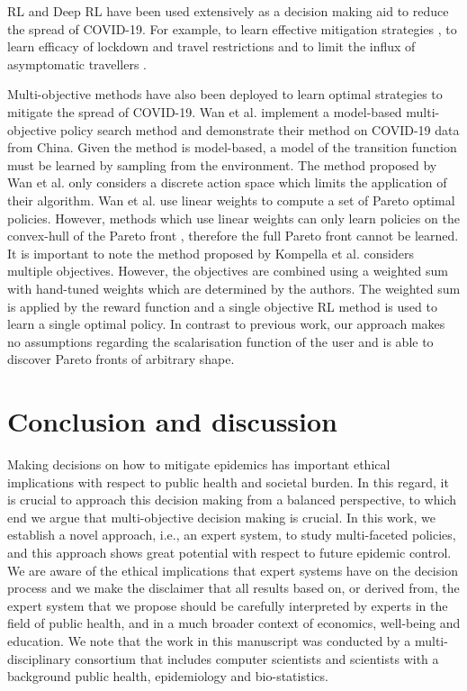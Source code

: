 \documentclass{article}
\renewcommand{\cite}[1]{\citep{#1}}
\begin{document}
RL and Deep RL have been used extensively as a decision making aid to reduce the spread of COVID-19. For example, to learn effective mitigation strategies \cite{ohi2020exploring}, to learn efficacy of lockdown and travel restrictions \cite{kwak2021covid} and to limit the influx of asymptomatic travellers \cite{bastani2021efficient}.

Multi-objective methods have also been deployed to learn optimal strategies to mitigate the spread of COVID-19. Wan et al. \cite{wan2021multi} implement a model-based multi-objective policy search method and demonstrate their method on COVID-19 data from China. Given the method is model-based, a model of the transition function must be learned by sampling from the environment. The method proposed by Wan et al. \cite{wan2021multi} only considers a discrete action space which limits the application of their algorithm. Wan et al. \cite{wan2021multi} use linear weights to compute a set of Pareto optimal policies. However, methods which use linear weights can only learn policies on the convex-hull of the Pareto front \cite{vamplew2008limitations}, therefore the full Pareto front cannot be learned. It is important to note the method proposed by Kompella et al. \cite{kompella2020reinforcement} considers multiple objectives. However, the objectives are combined using a weighted sum with hand-tuned weights which are determined by the authors. The weighted sum is applied by the reward function and a single objective RL method is used to learn a single optimal policy.
In contrast to previous work, our approach makes no assumptions regarding the scalarisation function of the user and is able to discover Pareto fronts of arbitrary shape.

\section{Conclusion and discussion}
Making decisions on how to mitigate epidemics has important ethical implications with respect to public health and societal burden. In this regard, it is crucial to approach this decision making from a balanced perspective, to which end we argue that multi-objective decision making is crucial. In this work, we establish a novel approach, i.e., an expert system, to study multi-faceted policies, and this approach shows great potential with respect to future epidemic control. We are aware of the ethical implications that expert systems have on the decision process and we make the disclaimer that all results based on, or derived from, the expert system that we propose should be carefully interpreted by experts in the field of public health, and in a much broader context of economics, well-being and education. We note that the work in this manuscript was conducted by a multi-disciplinary consortium that includes computer scientists and scientists with a background public health, epidemiology and bio-statistics.
\end{document}
